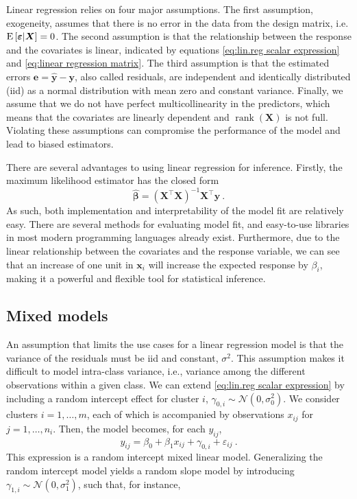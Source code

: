 Linear regression relies on four major assumptions. The first assumption, exogeneity, assumes that there is no error in the data from the design matrix, i.e. $\operatorname{E}\left[\bm \varepsilon | \bm X\right] = 0$. %
The second assumption is that the relationship between the response and the covariates is linear, indicated by equations \eqref{eq:lin.reg scalar expression} and \eqref{eq:linear regression matrix}. The third assumption is that the estimated errors $\bm e = \widehat{\bm y}-\bm y$, also called residuals, are independent and identically distributed (iid) as a normal distribution with mean zero and constant variance. Finally, we assume that we do not have perfect multicollinearity in the predictors, which means that the covariates are linearly dependent and $\operatorname{rank}(\bm X)$ is not full. Violating these assumptions can compromise the performance of the model and lead to biased estimators.

There are several advantages to using linear regression for inference. Firstly, the maximum likelihood estimator has the closed form
\begin{equation}
    \label{eq:theory:closed form linreg}
    \hat{\bm\beta} = (\bm X^\top \bm X)^{-1} \bm X^\top \bm y \ .
\end{equation}
As such, both implementation and interpretability of the model fit are relatively easy. There are several methods for evaluating model fit, and easy-to-use libraries in most modern programming languages already exist. Furthermore, due to the linear relationship between the covariates and the response variable, we can see that an increase of one unit in $\bm x_{i}$ will increase the expected response by $\beta_i$, making it a powerful and flexible tool for statistical inference.


\subsection{Mixed models}
\label{sec:theory:mixed models}
An assumption that limits the use cases for a linear regression model is that the variance of the residuals must be iid and constant, $\sigma^2$. This assumption makes it difficult to model intra-class variance, i.e., variance among the different observations within a given class. We can extend \eqref{eq:lin.reg scalar expression} by including a random intercept effect for cluster $i$, $\gamma_{0,i} \sim \mathcal N(0,\sigma^2_{0})$. We consider clusters $i=1, \dots, m$, each of which is accompanied by observations $x_{ij}$ for $j = 1, \dots, n_i$. Then, the model becomes, for each $y_{ij}$,
\begin{equation}
y_{ij} = \beta_0 + \beta_1 x_{ij} + \gamma_{0,i} + \varepsilon_{ij} \ .
\label{eq:mixed model scalar}
\end{equation}
This expression is a random intercept mixed linear model. Generalizing the random intercept model yields a random slope model by introducing $\gamma_{1,i} \sim \mathcal{N}(0,\sigma_1^2)$, such that, for instance,

